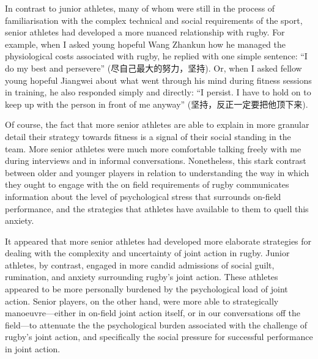 \begin{CJK}{UTF8}{gbsn}
In contrast to junior athletes, many of whom were still in the process of familiarisation with the complex technical and social requirements of the sport, senior athletes had developed a more nuanced relationship with rugby.  For example, when I asked young hopeful Wang Zhankun how he managed the physiological costs associated with rugby, he replied with one simple sentence: ``I do my best and persevere'' (尽自己最大的努力，坚持). Or, when I asked fellow young hopeful Jiangwei about what went through his mind during fitness sessions in training, he also responded simply and directly: ``I persist. I have to hold on to keep up with the person in front of me anyway'' (坚持，反正一定要把他顶下来).

Of course, the fact that more senior athletes are able to explain in more granular detail their strategy towards fitness is a signal of their social standing in the team.  More senior athletes were much more comfortable talking freely with me during interviews and in informal conversations.  Nonetheless, this stark contrast between older and younger players in relation to understanding the way in which they ought to engage with the on field requirements of rugby communicates information about the level of psychological stress that surrounds on-field performance, and the strategies that athletes have available to them to quell this anxiety.

It appeared that more senior athletes had developed more elaborate strategies for dealing with the complexity and uncertainty of joint action in rugby.  Junior athletes, by contrast, engaged in more candid admissions of social guilt, rumination, and anxiety surrounding rugby's joint action.  These athletes appeared to be more personally burdened by the psychological load of joint action.  Senior players, on the other hand, were more able to strategically manoeuvre---either in on-field joint action itself, or in our conversations off the field---to attenuate the the psychological burden associated with the challenge of rugby's joint action, and specifically the social pressure for successful performance in joint action.



\end{CJK}
